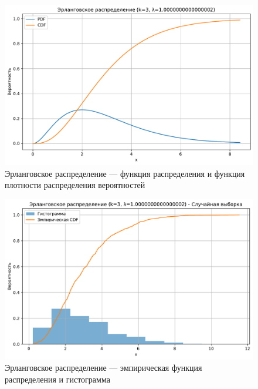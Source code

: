 \documentclass[a4paper,oneside,14pt]{extarticle}
\begin{document}
\begin{figure}[H]
	\centering
	\includegraphics[scale=0.7]{img/th_erlang.pdf}
	\caption{Эрланговское распределение --- функция распределения и функция плотности распределения вероятностей}
	\label{fig:}
\end{figure}

\begin{figure}[H]
	\centering
	\includegraphics[scale=0.7]{img/emp_erlang.pdf}
	\caption{Эрланговское распределение --- эмпирическая функция распределения и гистограмма}
	\label{fig:}
\end{figure}
\end{document}
